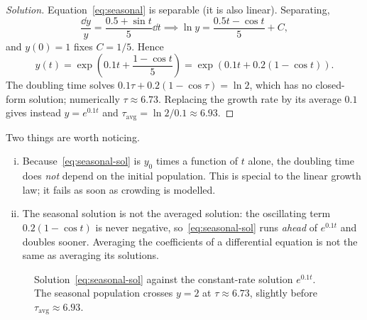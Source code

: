 \begin{proof}[Solution]
	Equation~\eqref{eq:seasonal} is separable (it is also linear). Separating,
	\[
		\frac{\dd y}{y} = \frac{0.5 + \sin t}{5} \dd t
		\implies \ln y = \frac{0.5 t - \cos t}{5} + C,
	\]
	and \(y(0) = 1\) fixes \(C = 1/5\). Hence
	\begin{equation}\label{eq:seasonal-sol}
		y(t) = \exp\left( 0.1 t + \frac{1 - \cos t}{5} \right)
		= \exp\left( 0.1t + 0.2\left( 1 - \cos t \right) \right).
	\end{equation}
	The doubling time solves \(0.1\tau + 0.2(1 - \cos \tau) = \ln 2\), which has no
	closed-form solution; numerically \(\tau \approx 6.73\). Replacing the growth rate by
	its average \(0.1\) gives instead \(y = e^{0.1t}\) and
	\(\tau_{\text{avg}} = \ln 2 / 0.1 \approx 6.93\).
\end{proof}

\begin{observation}
	Two things are worth noticing.
	\begin{enumerate}[(i)]
		\item Because~\eqref{eq:seasonal-sol} is \(y_0\) times a function of \(t\) alone,
		      the doubling time does \emph{not} depend on the initial population. This is
		      special to the linear growth law; it fails as soon as crowding is modelled.
		\item The seasonal solution is not the averaged solution: the oscillating term
		      \(0.2(1 - \cos t)\) is never negative, so~\eqref{eq:seasonal-sol} runs
		      \emph{ahead} of \(e^{0.1t}\) and doubles sooner. Averaging the coefficients of a
		      differential equation is not the same as averaging its solutions.
	\end{enumerate}
\end{observation}

\begin{figure}[H]
	\centering
	\caption{Solution~\eqref{eq:seasonal-sol} against the constant-rate solution
		\(e^{0.1t}\). The seasonal population crosses \(y = 2\) at
		\(\tau \approx 6.73\), slightly before \(\tau_{\text{avg}} \approx 6.93\).}
\end{figure}

